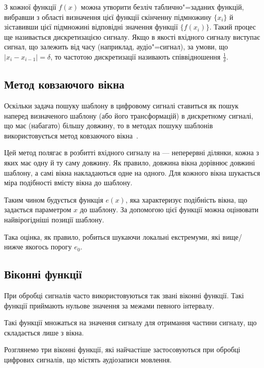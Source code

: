     З кожної функції $f(x)$ можна утворити безліч таблично"=заданих функцій, вибравши з області визначення цієї
    функції скінченну підмножину $\{x_i\}$ й зіставивши цієї підмножині відповідні значення функції $\{f(x_i)\}$.
    Такий процес ще називається дискретизацією сигналу.
    Якщо в якості вхідного сигналу виступає сигнал, що залежить від часу (наприклад, аудіо"=сигнал), за умови, що $|
    x_i - x_{i-1}| = \delta$, то частотою дискретизації називають співвідношення $\frac{1}{\delta}$.

    \subsection{Метод ковзаючого вікна}
    \label{ss:sliding-window}
        Оскільки задача пошуку шаблону в цифровому сигналі ставиться як пошук наперед визначеного шаблону (або його
        трансформацій) в дискретному сигналі, що має (набагато) більшу довжину, то в методах пошуку шаблонів
        використовується метод ковзаючого вікна~\cite{book5}.

        Цей метод полягає в розбитті вхідного сигналу на  --- неперервні ділянки, кожна з яких має
        одну й ту саму довжину.
        Як правило, довжина вікна дорівнює довжині шаблону, а самі вікна накладаються одне на одного.
        Для кожного вікна шукається міра подібності вмісту вікна до шаблону.

        Таким чином будується функція $e(x)$, яка характеризує подібність вікна, що задається параметром $x$ до
        шаблону.
        За допомогою цієї функції можна оцінювати найвірогідніші позиції шаблону.

        Така оцінка, як правило, робиться шукаючи локальні екстремуми, які вище/нижче якогось порогу $e_{0}$.

    \subsection{Віконні функції}
    \label{ss:window-functions}
        При обробці сигналів часто використовуються так звані віконні функції.
        Такі функції приймають нульове значення за межами певного інтервалу.

        Такі функції множаться на значення сигналу для отримання частини сигналу, що складається лише з вікна.

        Розглянемо три віконні функції, які найчастіше застосовуються при обробці цифрових сигналів, що містять
        аудіозаписи мовлення.

